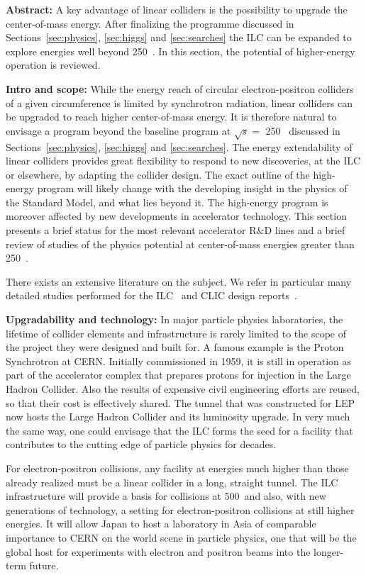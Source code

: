 {\bf Abstract:} A key advantage of linear colliders is the possibility to upgrade
the center-of-mass energy. After finalizing the programme discussed in
Sections~\ref{sec:physics}, \ref{sec:higgs} and \ref{sec:searches} the ILC can
be expanded to explore energies well beyond 250~\GeV{}. In this section, the
potential of higher-energy operation is reviewed.

{\bf Intro and scope:} While the energy reach of circular electron-positron
colliders of a given circumference is limited by synchrotron radiation,
linear colliders can be upgraded to reach higher center-of-mass energy.
It is therefore natural to envisage a program beyond the baseline program
at $\sqrt{s}=$ 250~\GeV{} discussed in Sections~\ref{sec:physics}, \ref{sec:higgs}
and \ref{sec:searches}. The energy extendability of linear colliders
provides great flexibility to respond to new discoveries, at the ILC or elsewhere,
by adapting the collider design. The exact outline of the high-energy
program will likely change with the developing insight in the physics of the Standard Model,
and what lies beyond it. The high-energy program is moreover affected by new developments
in accelerator technology. This section presents a brief status for the most relevant
accelerator R\&D lines and a brief review of studies of the physics potential at
center-of-mass energies greater than 250~\GeV.  

There exists an extensive literature on the subject. We refer in particular
many detailed studies performed for the ILC~\cite{Fujii:2015jha,Baer:2013cma}
and CLIC design reports~\cite{Linssen:2012hp}.


{\bf Upgradability and technology:}
In major particle physics laboratories, the lifetime of collider elements
and infrastructure is rarely limited to the scope of the project they were
designed and built for. A famous example is the Proton Synchrotron at CERN.
Initially commissioned in 1959, it is still in operation as
part of the accelerator complex that prepares protons for injection in the
Large Hadron Collider. Also the results of expensive civil engineering
efforts are reused, so that their cost is effectively shared. The tunnel
that was constructed for LEP now hosts the Large Hadron Collider and its
luminosity upgrade. In very much the same way, one could
envisage that the ILC forms the seed for a facility that contributes to the
cutting edge of particle physics for decades.

For electron-positron collisions, any facility at energies much higher than
those already realized must be a linear collider in a long, straight tunnel.
The ILC infrastructure will provide a basis for collisions at 500~\GeV and
also, with new generations of technology, a setting for electron-positron
collisions at still higher energies. It will allow Japan to host a laboratory
in Asia of comparable importance to CERN on the world scene in particle
physics, one that will be the global host for experiments with electron
and positron beams into the longer-term future.


